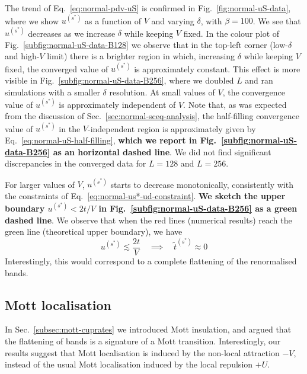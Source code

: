 The trend of Eq.~\eqref{eq:normal-pdv-uS} is confirmed in  Fig.~\ref{fig:normal-uS-data}, where we show $u^{(s^*)}$ as a function of $V$ and varying $\delta$, with $\beta=100$. We see that  $u^{(s^*)}$ decreases as we increase $\delta$ while keeping $V$ fixed. In the colour plot of  Fig.~\ref{subfig:normal-uS-data-B128} we observe that in the top-left corner (low-$\delta$ and high-$V$ limit) there is a brighter region in which, increasing $\delta$ while keeping $V$ fixed, the converged value of $u^{(s^*)}$ is approximately constant. This effect is more visible in Fig.~\ref{subfig:normal-uS-data-B256}, where we doubled $L$ and ran simulations with a smaller $\delta$ resolution. At small values of $V$, the convergence value of $u^{(s^*)}$ is approximately independent of $V$. Note that, as was expected from the discussion of Sec.~\ref{sec:normal-sceq-analysis}, the half-filling convergence value of $u^{(s^*)}$ in the $V$-independent region is approximately given by Eq.~\eqref{eq:normal-uS-half-filling}, {\color{tabred}\textbf{which we report in Fig.~\ref{subfig:normal-uS-data-B256} as an horizontal dashed line}}. We did not find significant discrepancies in the converged data for $L=128$ and $L=256$.

For larger values of $V$, $u^{(s^*)}$ starts to decrease monotonically, consistently with the constraints of Eq.~\eqref{eq:normal-us*-ud-constraint}. {\color{tabred}\textbf{We sketch the upper boundary $u^{(s^*)} < 2t/V$ in Fig.~\ref{subfig:normal-uS-data-B256} as a green dashed line}}. We observe that when the red lines (numerical results) reach the green line (theoretical upper boundary), we have
\[
	u^{(s^*)} \lesssim \frac{2t}{V}
	\quad\implies\quad
	\tilde{t}^{(s^*)} \approx 0
\]
Interestingly, this would correspond to a complete flattening of the renormalised bands.

\subsection{Mott localisation}\label{subsec:normal-mott-numeric}

In Sec.~\ref{subsec:mott-cuprates} we introduced Mott insulation, and argued that the flattening of bands is a signature of a Mott transition. Interestingly, our results suggest that Mott localisation is induced by the non-local attraction $-V$, instead of the usual Mott localisation induced by the local repulsion $+U$. 

